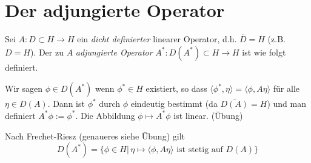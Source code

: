 \documentclass{mycourse}
\begin{document}
\section{Der adjungierte Operator}
Sei $A:D\subset H\to H$ ein \emph{dicht definierter} linearer Operator, d.h. $\overline{D}=H$ (z.B. $D=H$). Der zu $A$ \emph{adjungierte Operator} $A^*: D(A^*)\subset H \to H$ ist wie folgt definiert. 

Wir sagen $\phi \in D(A^*)$ wenn $\phi^*\in H$ existiert, so dass $\langle \phi^*, \eta\rangle = \langle \phi, A\eta\rangle$ für alle $\eta \in D(A)$. Dann ist $\phi^*$ durch $\phi$ eindeutig bestimmt (da $\overline{D(A)}=H$) und man definiert $A^* \phi:= \phi^*$. Die Abbildung $\phi \mapsto A^*\phi$ ist linear. (Übung)

Nach Frechet-Riesz (genaueres siehe Übung) gilt
\[
D(A^*)=\{\phi\in H|\, \eta \mapsto \langle \phi, A\eta\rangle \text{ ist stetig auf } D(A)\}
\]
\end{document}
